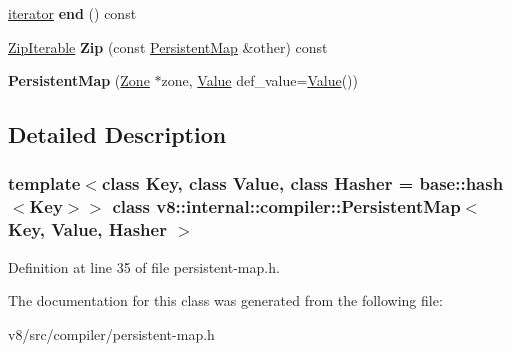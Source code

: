 \begin{DoxyCompactItemize}
\mbox{\hyperlink{classv8_1_1internal_1_1compiler_1_1PersistentMap_1_1iterator}{iterator}} {\bfseries end} () const
\item 
\mbox{\label{classv8_1_1internal_1_1compiler_1_1PersistentMap_ab43e17960eec9e2124c7ef15b77bf236}} 
\mbox{\hyperlink{structv8_1_1internal_1_1compiler_1_1PersistentMap_1_1ZipIterable}{Zip\+Iterable}} {\bfseries Zip} (const \mbox{\hyperlink{classv8_1_1internal_1_1compiler_1_1PersistentMap}{Persistent\+Map}} \&other) const
\item 
\mbox{\label{classv8_1_1internal_1_1compiler_1_1PersistentMap_a712e8f4381bcb0473fb5a73ad5b20788}} 
{\bfseries Persistent\+Map} (\mbox{\hyperlink{classv8_1_1internal_1_1Zone}{Zone}} $\ast$zone, \mbox{\hyperlink{classv8_1_1Value}{Value}} def\+\_\+value=\mbox{\hyperlink{classv8_1_1Value}{Value}}())
\end{DoxyCompactItemize}


\subsection{Detailed Description}
\subsubsection*{template$<$class Key, class Value, class Hasher = base\+::hash$<$\+Key$>$$>$\newline
class v8\+::internal\+::compiler\+::\+Persistent\+Map$<$ Key, Value, Hasher $>$}



Definition at line 35 of file persistent-\/map.\+h.



The documentation for this class was generated from the following file\+:\begin{DoxyCompactItemize}
\item 
v8/src/compiler/persistent-\/map.\+h\end{DoxyCompactItemize}
